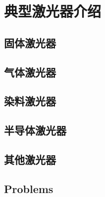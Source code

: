 \chapter{典型激光器介绍}
\section{固体激光器}
\section{气体激光器}
\section{染料激光器}
\section{半导体激光器}
\section{其他激光器}
\section*{Problems}